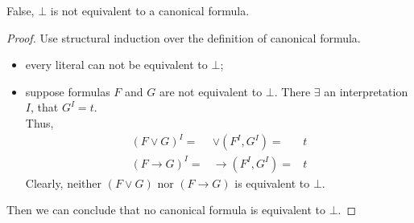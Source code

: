 \noindent
False, $\bot$ is not equivalent to a canonical formula. 
\begin{proof}
Use structural induction over the definition of canonical formula. 
\begin{itemize}
\item every literal can not be equivalent to $\bot$;
\item suppose formulas $F$ and $G$ are not equivalent to $\bot$. There $\exists$ an interpretation $I$, that $G^I = t$. \\
Thus, 
\begin{eqnarray*}
(F \vee G)^I =& \vee(F^I, G^I) =& t \\
(F \rightarrow G)^I =& \rightarrow (F^I, G^I) =& t 
\end{eqnarray*}
Clearly, neither $(F \vee G)$ nor $(F \rightarrow G)$ is equivalent to $\bot$. 
\end{itemize}
Then we can conclude that no canonical formula is equivalent to $\bot$. 
\end{proof}

\newpage